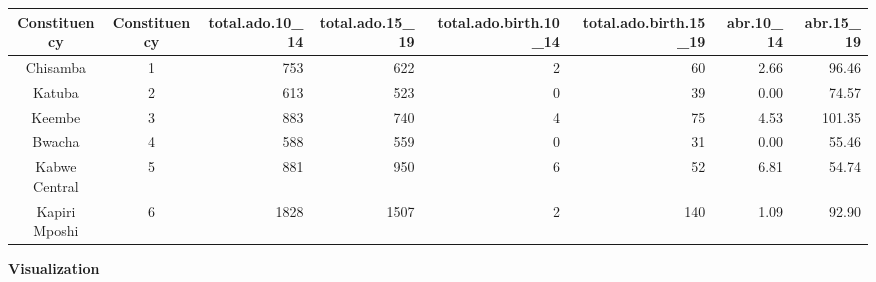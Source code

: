 \documentclass[
]{article}
\begin{document}
\begin{table}[!t]
\fontsize{12.0pt}{14.4pt}\selectfont
\begin{tabular*}{\linewidth}{@{\extracolsep{\fill}}ccrrrrrr}
\toprule
Constituency & Constituency & total.ado.10\_14 & total.ado.15\_19 & total.ado.birth.10\_14 & total.ado.birth.15\_19 & abr.10\_14 & abr.15\_19 \\ 
\midrule\addlinespace[2.5pt]
Chisamba & 1 & 753 & 622 & 2 & 60 & 2.66 & 96.46 \\ 
Katuba & 2 & 613 & 523 & 0 & 39 & 0.00 & 74.57 \\ 
Keembe & 3 & 883 & 740 & 4 & 75 & 4.53 & 101.35 \\ 
Bwacha & 4 & 588 & 559 & 0 & 31 & 0.00 & 55.46 \\ 
Kabwe Central & 5 & 881 & 950 & 6 & 52 & 6.81 & 54.74 \\ 
Kapiri Mposhi & 6 & 1828 & 1507 & 2 & 140 & 1.09 & 92.90 \\ 
\bottomrule
\end{tabular*}
\end{table}

\textbf{Visualization}
\end{document}
